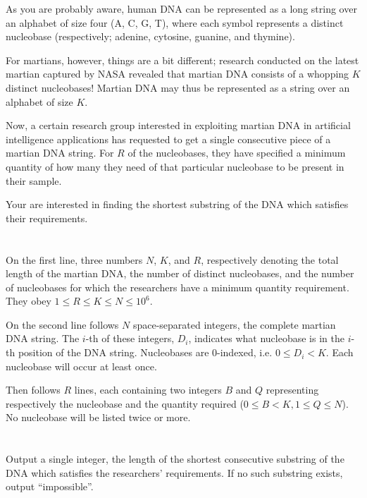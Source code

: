\ifx\boi\undefined\fi
\def\version{jury-draft}
As you are probably aware, human DNA can be represented as a long string over
an alphabet of size four ({A, C, G, T}), where each symbol represents a
distinct nucleobase (respectively; adenine, cytosine, guanine, and thymine).

For martians, however, things are a bit different; research conducted on the
latest martian captured by NASA revealed that martian DNA consists of a
whopping $K$ distinct nucleobases! Martian DNA may thus be represented as a
string over an alphabet of size $K$.

Now, a certain research group interested in exploiting martian DNA in
artificial intelligence applications has requested to get a single consecutive
piece of a martian DNA string. For $R$ of the nucleobases, they have specified
a minimum quantity of how many they need of that particular nucleobase to be
present in their sample.

Your are interested in finding the shortest substring of the DNA which satisfies their requirements.

\section*{}
On the first line, three numbers $N$, $K$, and $R$, respectively denoting the
total length of the martian DNA, the number of distinct nucleobases, and the
number of nucleobases for which the researchers have a minimum quantity
requirement. They obey $1 \le R \le K \le N \le 10^6$.

On the second line follows $N$ space-separated integers, the complete martian
DNA string. The $i$-th of these integers, $D_i$, indicates what nucleobase is
in the $i$-th position of the DNA string. Nucleobases are $0$-indexed, i.e. $0
\leq D_i < K$. Each nucleobase will occur at least once.

Then follows $R$ lines, each containing two integers $B$ and $Q$ representing
respectively the nucleobase and the quantity required ($0 \le B < K, 1 \le Q \le N$).
No nucleobase will be listed twice or more.

\section*{\outputsection}
Output a single integer, the length of the shortest consecutive substring of
the DNA which satisfies the researchers' requirements. If no such substring
exists, output ``impossible''.


